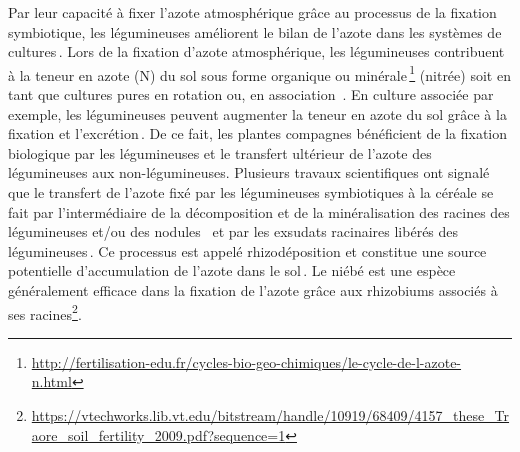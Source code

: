 \documentclass[a4paper,11pt]{article}
\begin{document}
Par leur capacité à fixer l’azote atmosphérique grâce au processus de
la fixation symbiotique, les légumineuses améliorent le bilan de
l'azote dans les systèmes de
cultures\,\cite{Ndakidemi_2005,Fustec11}. Lors de la fixation d’azote
atmosphérique, les légumineuses contribuent à la teneur en azote (N)
du sol sous forme organique ou
minérale\,\footnote{\url{http://fertilisation-edu.fr/cycles-bio-geo-chimiques/le-cycle-de-l-azote-n.html}}
(nitrée) soit en tant que cultures pures en rotation ou, en
association \,\cite{Bado_2006,Chu_2004,Makoi_2009,Ndakidemi_2005}. En
culture associée par exemple, les légumineuses peuvent augmenter la
teneur en azote du sol grâce à la fixation et
l’excrétion\,\cite{Trenbath_1976,Fustec11}. De ce fait, les plantes
compagnes bénéficient de la fixation biologique par les légumineuses
et le transfert ultérieur de l’azote des légumineuses aux
non-légumineuses. Plusieurs travaux scientifiques ont signalé que le
transfert de l’azote fixé par les légumineuses symbiotiques à la
céréale se fait par l’intermédiaire de la décomposition et de la
minéralisation des racines des légumineuses et/ou des nodules
\,\cite{Burity_1989} et par les exsudats racinaires libérés des
légumineuses\,\cite{Ndakidemi_2005,Makoi_2009}. Ce processus est
appelé rhizodéposition\cite{Fustec11} et constitue une source
potentielle d’accumulation de l’azote dans le
sol\,\cite{Koulibi_FideleZONGO}. Le niébé est une espèce généralement
efficace dans la fixation de l’azote grâce aux rhizobiums associés à
ses
racines\footnote{\url{https://vtechworks.lib.vt.edu/bitstream/handle/10919/68409/4157_these_Traore_soil_fertility_2009.pdf?sequence=1}}.

\newpage

 
  
\end{document}
